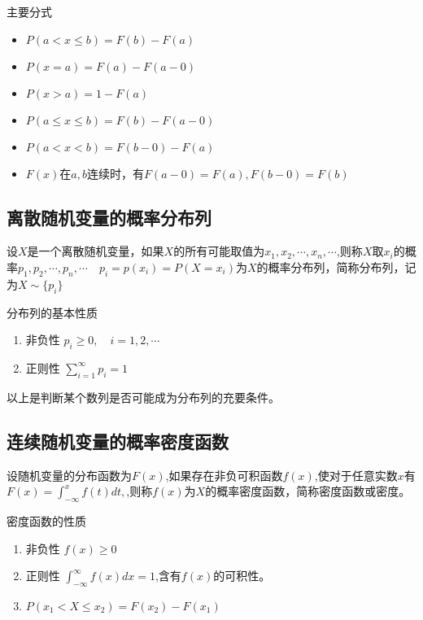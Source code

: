 主要分式
\begin{itemize}
    \item $P(a < x \leq b)=F(b)-F(a)$
    \item $P(x=a)=F(a)-F(a-0)$
    \item $P(x>a)=1-F(a)$
    \item $P(a \leq x \leq b)=F(b)-F(a-0)$
    \item $P(a < x < b ) =F(b-0)-F(a)$
    \item $F(x)$在$a,b$连续时，有$F(a-0)=F(a),F(b-0)=F(b)$
\end{itemize}

\subsection{离散随机变量的概率分布列}
\begin{definition}
    设$X$是一个离散随机变量，如果$X$的所有可能取值为$x_1,x_2,\cdots,x_n,\cdots$,则称$X$取$x_i$的概率$p_1,p_2,\cdots,p_n,\cdots \quad p_i=p(x_i)=P(X=x_i)$为$X$的概率分布列，简称分布列，记为$X \sim \{p_i\}$
\end{definition}
\begin{property} 分布列的基本性质
    \begin{enumerate}
        \item 非负性 $p_i \geqslant 0,\quad i=1,2,\cdots$
        \item 正则性 $\sum\limits_{i = 1}^\infty  {{p_i}}  = 1$
    \end{enumerate}
\end{property}
以上是判断某个数列是否可能成为分布列的充要条件。

\subsection{连续随机变量的概率密度函数}
\begin{definition}
    设随机变量的分布函数为$F(x)$,如果存在非负可积函数$f(x)$,使对于任意实数$x$有$F(x) = \int_{ - \infty }^x {f(t)dt,} $,则称$f(x)$为$X$的概率密度函数，简称密度函数或密度。
\end{definition}

\begin{property} 密度函数的性质
    \begin{enumerate}
        \item 非负性 $f(x) \geqslant 0$
        \item 正则性 $\int_{ - \infty }^\infty  {f(x)dx}  = 1$,含有$f(x)$的可积性。
        \item $P( {x_1} < X \leqslant {x_2})  = F({x_2}) - F({x_1})$
    \end{enumerate}
\end{property}

